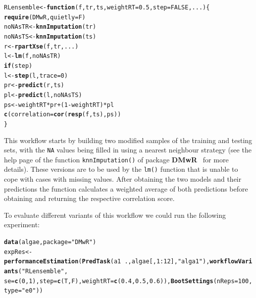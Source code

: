 \documentclass[10pt,a4paper]{article}\usepackage[]{graphicx}\usepackage[]{color}
\makeatletter
\newcommand{\hlnum}[1]{\textcolor[rgb]{0.686,0.059,0.569}{#1}}%
\newcommand{\hlstr}[1]{\textcolor[rgb]{0.192,0.494,0.8}{#1}}%
\newcommand{\hlopt}[1]{\textcolor[rgb]{0,0,0}{#1}}%
\newcommand{\hlstd}[1]{\textcolor[rgb]{0.345,0.345,0.345}{#1}}%
\newcommand{\hlkwa}[1]{\textcolor[rgb]{0.161,0.373,0.58}{\textbf{#1}}}%
\newcommand{\hlkwb}[1]{\textcolor[rgb]{0.69,0.353,0.396}{#1}}%
\newcommand{\hlkwc}[1]{\textcolor[rgb]{0.333,0.667,0.333}{#1}}%
\newcommand{\hlkwd}[1]{\textcolor[rgb]{0.737,0.353,0.396}{\textbf{#1}}}%
\newenvironment{kframe}{%
 \def\at@end@of@kframe{}%
 \ifinner\ifhmode%
  \def\at@end@of@kframe{\end{minipage}}%
  \begin{minipage}{\columnwidth}%
 \fi\fi%
 \def\FrameCommand##1{\hskip\@totalleftmargin \hskip-\fboxsep
 \colorbox{shadecolor}{##1}\hskip-\fboxsep
     \hskip-\linewidth \hskip-\@totalleftmargin \hskip\columnwidth}%
 \MakeFramed {\advance\hsize-\width
   \@totalleftmargin\z@ \linewidth\hsize
   \@setminipage}}%
 {\par\unskip\endMakeFramed%
 \at@end@of@kframe}
\newenvironment{knitrout}{}{} %
\makeatother
\begin{document}
\begin{knitrout}
\color{fgcolor}\begin{kframe}
\begin{alltt}
\hlstd{RLensemble} \hlkwb{<-} \hlkwa{function}\hlstd{(}\hlkwc{f}\hlstd{,} \hlkwc{tr}\hlstd{,} \hlkwc{ts}\hlstd{,} \hlkwc{weightRT} \hlstd{=} \hlnum{0.5}\hlstd{,} \hlkwc{step} \hlstd{=} \hlnum{FALSE}\hlstd{,} \hlkwc{...}\hlstd{) \{}
    \hlkwd{require}\hlstd{(DMwR,} \hlkwc{quietly} \hlstd{= F)}
    \hlstd{noNAsTR} \hlkwb{<-} \hlkwd{knnImputation}\hlstd{(tr)}
    \hlstd{noNAsTS} \hlkwb{<-} \hlkwd{knnImputation}\hlstd{(ts)}
    \hlstd{r} \hlkwb{<-} \hlkwd{rpartXse}\hlstd{(f, tr, ...)}
    \hlstd{l} \hlkwb{<-} \hlkwd{lm}\hlstd{(f, noNAsTR)}
    \hlkwa{if} \hlstd{(step)}
        \hlstd{l} \hlkwb{<-} \hlkwd{step}\hlstd{(l,} \hlkwc{trace} \hlstd{=} \hlnum{0}\hlstd{)}
    \hlstd{pr} \hlkwb{<-} \hlkwd{predict}\hlstd{(r, ts)}
    \hlstd{pl} \hlkwb{<-} \hlkwd{predict}\hlstd{(l, noNAsTS)}
    \hlstd{ps} \hlkwb{<-} \hlstd{weightRT} \hlopt{*} \hlstd{pr} \hlopt{+} \hlstd{(}\hlnum{1} \hlopt{-} \hlstd{weightRT)} \hlopt{*} \hlstd{pl}
    \hlkwd{c}\hlstd{(}\hlkwc{correlation} \hlstd{=} \hlkwd{cor}\hlstd{(}\hlkwd{resp}\hlstd{(f, ts), ps))}
\hlstd{\}}
\end{alltt}
\end{kframe}
\end{knitrout}


This workflow starts by building two modified samples of the training
and testing sets, with the \texttt{NA} values being filled in using a
nearest neighbour strategy (see the help page of the function
\texttt{knnImputation()} of package \textbf{DMwR}~\cite{Tor10} for more
details). These versions are to be used by the \texttt{lm()} function
that is unable to cope with cases with missing values. After obtaining
the two models and their predictions the function calculates a
weighted average of both predictions before obtaining and returning
the respective correlation score.

To evaluate different variants of this workflow we could run the
following experiment:

\begin{knitrout}
\color{fgcolor}\begin{kframe}
\begin{alltt}
\hlkwd{data}\hlstd{(algae,} \hlkwc{package} \hlstd{=} \hlstr{"DMwR"}\hlstd{)}
\hlstd{expRes} \hlkwb{<-} \hlkwd{performanceEstimation}\hlstd{(}\hlkwd{PredTask}\hlstd{(a1} \hlopt{~} \hlstd{., algae[,} \hlnum{1}\hlopt{:}\hlnum{12}\hlstd{],} \hlstr{"alga1"}\hlstd{),} \hlkwd{workflowVariants}\hlstd{(}\hlstr{"RLensemble"}\hlstd{,}
    \hlkwc{se} \hlstd{=} \hlkwd{c}\hlstd{(}\hlnum{0}\hlstd{,} \hlnum{1}\hlstd{),} \hlkwc{step} \hlstd{=} \hlkwd{c}\hlstd{(T, F),} \hlkwc{weightRT} \hlstd{=} \hlkwd{c}\hlstd{(}\hlnum{0.4}\hlstd{,} \hlnum{0.5}\hlstd{,} \hlnum{0.6}\hlstd{)),} \hlkwd{BootSettings}\hlstd{(}\hlkwc{nReps} \hlstd{=} \hlnum{100}\hlstd{,} \hlkwc{type} \hlstd{=} \hlstr{"e0"}\hlstd{))}
\end{alltt}
\end{kframe}
\end{knitrout}
\end{document}
